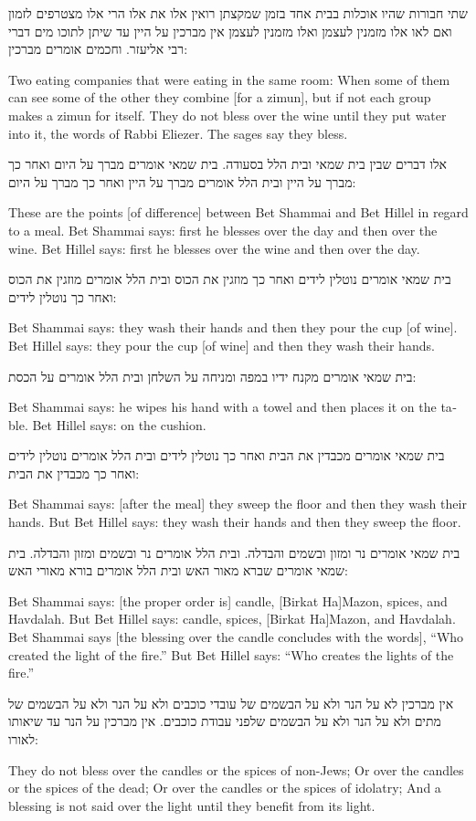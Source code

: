 \documentclass[12pt, openany]{book}
\newcommand{\textblock}[2]{
	{\fontsize{16pt}{20pt}\selectfont #1\\}
	
	\begin{english}
		#2
	\end{english}
	\clearpage
}
\begin{document}
\textblock{שתי חבורות שהיו אוכלות בבית אחד בזמן שמקצתן רואין אלו את אלו הרי אלו מצטרפים לזמון ואם לאו אלו מזמנין לעצמן ואלו מזמנין לעצמן אין מברכין על היין עד שיתן לתוכו מים דברי רבי אליעזר. וחכמים אומרים מברכין: }{Two eating companies that were eating in the same room: When some of them can see some of the other they combine {[for a zimun]}, but if not each group makes a zimun for itself. They do not bless over the wine until they put water into it, the words of Rabbi Eliezer. The sages say they bless.}
\textblock{אלו דברים שבין בית שמאי ובית הלל בסעודה. בית שמאי אומרים מברך על היום ואחר כך מברך על היין ובית הלל אומרים מברך על היין ואחר כך מברך על היום: }{These are the points {[of difference]} between Bet Shammai and Bet Hillel in regard to a meal. Bet Shammai says:  first he blesses over the day and then over the wine. Bet Hillel says:  first he blesses over the wine and then over the day.}
\textblock{בית שמאי אומרים נוטלין לידים ואחר כך מוזגין את הכוס ובית הלל אומרים מוזגין את הכוס ואחר כך נוטלין לידים: }{Bet Shammai says:  they wash their hands and then they pour the cup {[of wine]}. Bet Hillel says: they pour the cup {[of wine]} and then they wash their hands.}
\textblock{בית שמאי אומרים מקנח ידיו במפה ומניחה על השלחן ובית הלל אומרים על הכסת: }{Bet Shammai says: he wipes his hand with a towel and then places it on the table. Bet Hillel says: on the cushion.}
\textblock{בית שמאי אומרים מכבדין את הבית ואחר כך נוטלין לידים ובית הלל אומרים נוטלין לידים ואחר כך מכבדין את הבית: }{Bet Shammai says: {[after the meal]} they sweep the floor and then they wash their hands. But Bet Hillel says: they wash their hands and then they sweep the floor.}
\textblock{בית שמאי אומרים נר ומזון ובשמים והבדלה. ובית הלל אומרים נר ובשמים ומזון והבדלה. בית שמאי אומרים שברא מאור האש ובית הלל אומרים בורא מאורי האש: }{Bet Shammai says: {[the proper order is]} candle, {[Birkat Ha]}Mazon, spices, and Havdalah. But Bet Hillel says: candle, spices, {[Birkat Ha]}Mazon, and Havdalah. Bet Shammai says {[the blessing over the candle concludes with the words]}, “Who created the light of the fire.” But Bet Hillel says: “Who creates the lights of the fire.”}
\textblock{אין מברכין לא על הנר ולא על הבשמים של עובדי כוכבים ולא על הנר ולא על הבשמים של מתים ולא על הנר ולא על הבשמים שלפני עבודת כוכבים. אין מברכין על הנר עד שיאותו לאורו: }{They do not bless over the candles or the spices of non-Jews; Or over the candles or the spices of the dead; Or over the candles or the spices of idolatry; And a blessing is not said over the light until they benefit from its light.}
\end{document}

